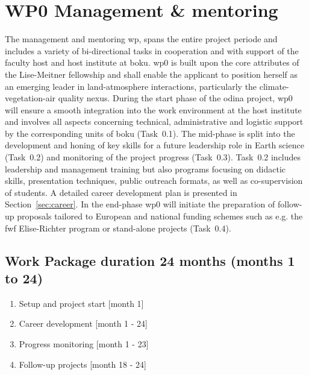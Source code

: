 \section{WP0 Management \& mentoring}
\label{sec:wp0}
The management and mentoring \gls{wp}, spans the entire project periode and includes a variety of bi-directional tasks in cooperation and with support of the faculty host and host institute at \gls{boku}. \gls{wp}0 is built upon the core attributes of the Lise-Meitner fellowship and shall enable the applicant to position herself as an emerging leader in land-atmosphere interactions, particularly the climate-vegetation-air quality nexus. During the start phase of the \gls{odina} project, \gls{wp}0 will ensure a smooth integration into the work environment at the host institute and involves all aspects concerning technical, administrative and logistic support by the corresponding units of \gls{boku} (Task~0.1). The mid-phase is split into the development and honing of key skills for a future leadership role in Earth science (Task~0.2) and monitoring of the project progress (Task~0.3). Task~0.2 includes leadership and management training but also programs focusing on didactic skills, presentation techniques, public outreach formats, as well as co-supervision of students. A detailed career development plan is presented in Section~\ref{sec:career}. In the end-phase \gls{wp}0 will initiate the preparation of follow-up proposals tailored to European and national funding schemes such as e.g. the \gls{fwf} Elise-Richter program or stand-alone projects (Task~0.4).
{
\subsection*{Work Package duration 24 months (months 1 to 24)}
\begin{enumerate}[start=1,label={T0.\arabic*}]
  \itemsep0pt
\item Setup and project start \hfill [month 1]
\item Career development \hfill [month 1 - 24]
\item Progress monitoring \hfill [month 1 - 23]
\item Follow-up projects \hfill [month 18 - 24]
\end{enumerate}}

